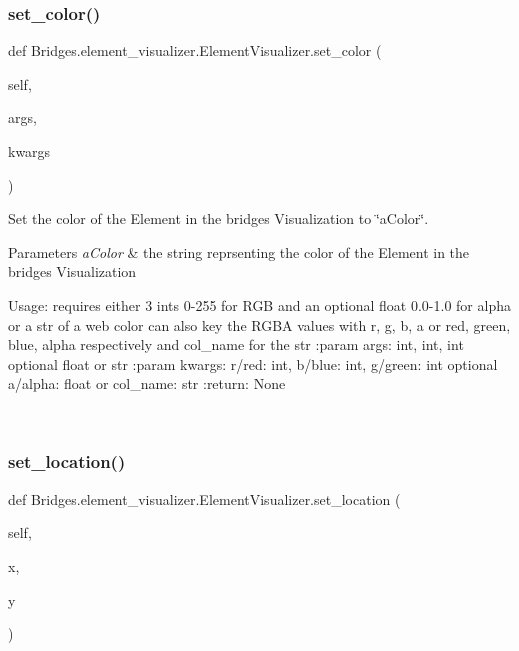 \subsubsection{\texorpdfstring{set\+\_\+color()}{set\_color()}}
{\footnotesize\ttfamily def Bridges.\+element\+\_\+visualizer.\+Element\+Visualizer.\+set\+\_\+color (\begin{DoxyParamCaption}\item[{}]{self,  }\item[{}]{args,  }\item[{}]{kwargs }\end{DoxyParamCaption})}



Set the color of the Element in the bridges Visualization to \char`\"{}a\+Color\char`\"{}. 


\begin{DoxyParams}{Parameters}
{\em a\+Color} & the string reprsenting the color of the Element in the bridges Visualization\begin{DoxyVerb}Usage: requires either 3 ints 0-255 for RGB and an optional float 0.0-1.0 for alpha or a str of a web color
can also key the RGBA values with r, g, b, a or red, green, blue, alpha respectively and col_name for the str
:param args: int, int, int optional float or str
:param kwargs: r/red: int, b/blue: int, g/green: int optional a/alpha: float or col_name: str
:return: None
\end{DoxyVerb}
 \\
\hline
\end{DoxyParams}
\mbox{\label{class_bridges_1_1element__visualizer_1_1_element_visualizer_ad383e4865437f64afa039924658d49ba}} 
\subsubsection{\texorpdfstring{set\+\_\+location()}{set\_location()}}
{\footnotesize\ttfamily def Bridges.\+element\+\_\+visualizer.\+Element\+Visualizer.\+set\+\_\+location (\begin{DoxyParamCaption}\item[{}]{self,  }\item[{}]{x,  }\item[{}]{y }\end{DoxyParamCaption})}



